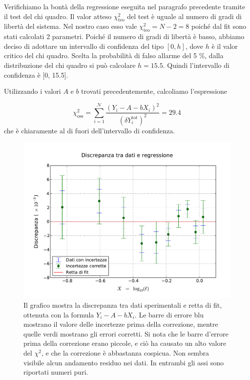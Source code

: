 Verifichiamo la bontà della regressione eseguita nel paragrafo precedente tramite il test del chi quadro.
Il valor atteso $\chi^2_{\text{teo}}$ del test è uguale al numero di gradi di libertà del sistema. Nel nostro caso
esso vale $\chi^2_{\text{teo}} = N - 2 = 8$ poiché dal fit sono stati calcolati 2 parametri. Poiché
il numero di gradi di libertà è basso, abbiamo deciso di adottare un intervallo di confidenza del tipo $[0, h]$,
dove $h$ è il valor critico del chi quadro. Scelta la probabilità di falso allarme del 5 \%, dalla distribuzione
del chi quadro si può calcolare $h = 15.5$. Quindi l'intervallo di confidenza è [0, 15.5]. 

Utilizzando i valori $A$ e $b$ trovati precedentemente, calcoliamo l'espressione

\begin{equation}
    \chi^2_{\text{oss}} = \sum_{i=1}^\mathcal{N} \frac{(Y_i - A - bX_i)^2}{(\delta Y_i^{\text{tot}})^2} = 29.4
\end{equation}
%
che è chiaramente al di fuori dell'intervallo di confidenza.

\begin{figure}
    \centering
    \includegraphics[width=115mm]{immagini/l_discrepanza.pdf}
    \caption{Il grafico mostra la discrepanza tra dati sperimentali e retta di fit, ottenuta con la formula $Y_i - A - bX_i$.
        Le barre di errore blu mostrano il valore delle incertezze prima della correzione, mentre quelle verdi mostrano gli errori
        corretti. Si nota che le barre d'errore prima della correzione erano piccole, e ciò ha causato un alto
        valore del $\chi^2$, e che la correzione è abbastanza cospicua. Non sembra visibile alcun andamento residuo nei dati.
        In entrambi gli assi sono riportati numeri puri.}
    \label{fig:l_discrepanza}
\end{figure}


